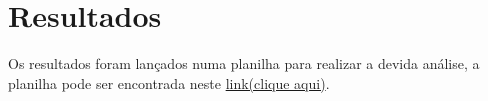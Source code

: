 \section{Resultados}
Os resultados foram lançados numa planilha para realizar a devida análise, a planilha pode ser encontrada neste \href{https://docs.google.com/a/ufrn.edu.br/spreadsheets/d/1tey8rUazIv3H-rDvTVuX3HWysaB38WmbdmQCpsBp2zY/edit?usp=sharing}{link(clique aqui)}.
